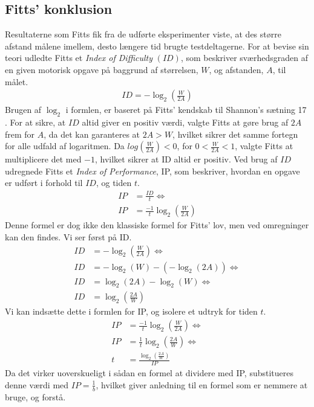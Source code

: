 \subsection*{Fitts' konklusion}
Resultaterne som Fitts fik fra de udførte eksperimenter viste, at des større afstand målene imellem, desto længere tid brugte testdeltagerne. For at bevise sin teori udledte Fitts et \textit{Index of Difficulty} $(ID)$, som beskriver sværhedsgraden af en given motorisk opgave på baggrund af størrelsen, $W$, og afstanden, $A$, til målet.
\begin{align*}
ID = -\log_2\left(\frac{W}{2A}\right)
\end{align*}
Brugen af $\log_2$ i formlen, er baseret på Fitts' kendskab til Shannon's sætning 17 \cite{goldberg2015}. For at sikre, at $ID$ altid giver en positiv værdi, valgte Fitts at gøre brug af $2A$ frem for $A$, da det kan garanteres at $2A > W$, hvilket sikrer det samme fortegn for alle udfald af logaritmen. Da $log\left(\frac{W}{2A}\right)<0$, for $0<\frac{W}{2A}<1$, valgte Fitts at multiplicere det med $-1$, hvilket sikrer at ID altid er positiv.
Ved brug af $ID$ udregnede Fitts et \textit{Index of Performance}, IP, som beskriver, hvordan en opgave er udført i forhold til $ID$, og tiden $t$.
\begin{align*}
IP &= \frac{ID}{t}\Leftrightarrow\\
IP &= \frac{-1}{t}\log_2\left(\frac{W}{2A}\right)
\end{align*}
Denne formel er dog ikke den klassiske formel for Fitts' lov, men ved omregninger kan den findes. Vi ser først på ID.
\begin{align*}
ID &= -\log_2\left(\frac{W}{2A}\right) \Leftrightarrow\\
ID &= -\log_2\left(W\right)-\left(-\log_2\left(2A\right)\right) \Leftrightarrow\\
ID &= \log_2\left(2A\right)-\log_2\left(W\right) \Leftrightarrow\\
ID &= \log_2\left(\frac{2A}{W}\right)
\end{align*}
Vi kan indsætte dette i formlen for IP, og isolere et udtryk for tiden $t$.
\begin{align*}
IP &=\frac{-1}{t}\log_2\left(\frac{W}{2A}\right) \Leftrightarrow\\ 
IP &= \frac{1}{t}\log_2\left(\frac{2A}{W}\right) \Leftrightarrow\\ 
t &= \frac{\log_2\left(\frac{2A}{W}\right)}{IP}
\end{align*}
Da det virker uoverskueligt i sådan en formel at dividere med IP, substitueres denne værdi med $IP = \frac{1}{b}$, hvilket giver anledning til en formel som er nemmere at bruge, og forstå.
